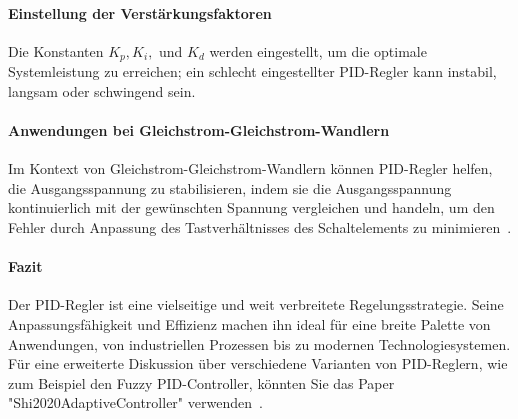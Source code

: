 \paragraph{Einstellung der Verstärkungsfaktoren}
Die Konstanten \( K_p, K_i, \) und \( K_d \) werden eingestellt, um die optimale Systemleistung zu erreichen; ein schlecht eingestellter PID-Regler kann instabil, langsam oder schwingend sein.

\paragraph{Anwendungen bei Gleichstrom-Gleichstrom-Wandlern}
Im Kontext von Gleichstrom-Gleichstrom-Wandlern können PID-Regler helfen, die Ausgangsspannung zu stabilisieren, indem sie die Ausgangsspannung kontinuierlich mit der gewünschten Spannung vergleichen und handeln, um den Fehler durch Anpassung des Tastverhältnisses des Schaltelements zu minimieren~\cite[p.~4]{Almawlawe2023}.

\paragraph{Fazit}
Der PID-Regler ist eine vielseitige und weit verbreitete Regelungsstrategie. Seine Anpassungsfähigkeit und Effizienz machen ihn ideal für eine breite Palette von Anwendungen, von industriellen Prozessen bis zu modernen Technologiesystemen. Für eine erweiterte Diskussion über verschiedene Varianten von PID-Reglern, wie zum Beispiel den Fuzzy PID-Controller, könnten Sie das Paper "Shi2020AdaptiveController" verwenden~\cite[p.~9]{Shi2020AdaptiveController}.
